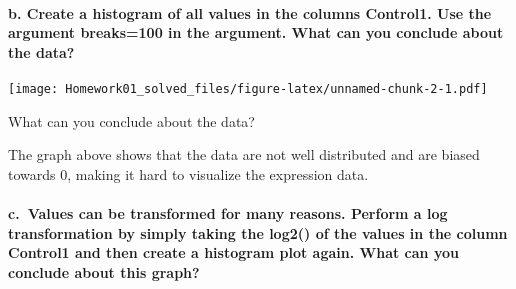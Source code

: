 \documentclass[
]{article}
\newenvironment{Shaded}{\begin{snugshade}}{\end{snugshade}}
\newcommand{\AttributeTok}[1]{\textcolor[rgb]{0.77,0.63,0.00}{#1}}
\newcommand{\CommentTok}[1]{\textcolor[rgb]{0.56,0.35,0.01}{\textit{#1}}}
\newcommand{\DecValTok}[1]{\textcolor[rgb]{0.00,0.00,0.81}{#1}}
\newcommand{\FunctionTok}[1]{\textcolor[rgb]{0.00,0.00,0.00}{#1}}
\newcommand{\NormalTok}[1]{#1}
\newcommand{\SpecialCharTok}[1]{\textcolor[rgb]{0.00,0.00,0.00}{#1}}
\begin{document}
\hypertarget{b.-create-a-histogram-of-all-values-in-the-columns-control1.-use-the-argument-breaks100-in-the-argument.-what-can-you-conclude-about-the-data}{%
\paragraph{\texorpdfstring{b. Create a histogram of all values in the
columns \textbf{Control1}. Use the argument \textbf{breaks=100} in the
argument. What can you conclude about the
data?}{b. Create a histogram of all values in the columns Control1. Use the argument breaks=100 in the argument. What can you conclude about the data?}}\label{b.-create-a-histogram-of-all-values-in-the-columns-control1.-use-the-argument-breaks100-in-the-argument.-what-can-you-conclude-about-the-data}}

\begin{Shaded}
\end{Shaded}

\texttt{[image: Homework01\_solved\_files/figure-latex/unnamed-chunk-2-1.pdf]}

What can you conclude about the data?

The graph above shows that the data are not well distributed and are
biased towards 0, making it hard to visualize the expression data.

\hypertarget{c.-values-can-be-transformed-for-many-reasons.-perform-a-log-transformation-by-simply-taking-the-log2-of-the-values-in-the-column-control1-and-then-create-a-histogram-plot-again.-what-can-you-conclude-about-this-graph}{%
\paragraph{\texorpdfstring{c.~Values can be transformed for many
reasons. Perform a log transformation by simply taking the
\textbf{log2()} of the values in the column \textbf{Control1} and then
create a histogram plot again. What can you conclude about this
graph?}{c.~Values can be transformed for many reasons. Perform a log transformation by simply taking the log2() of the values in the column Control1 and then create a histogram plot again. What can you conclude about this graph?}}\label{c.-values-can-be-transformed-for-many-reasons.-perform-a-log-transformation-by-simply-taking-the-log2-of-the-values-in-the-column-control1-and-then-create-a-histogram-plot-again.-what-can-you-conclude-about-this-graph}}
\end{document}
